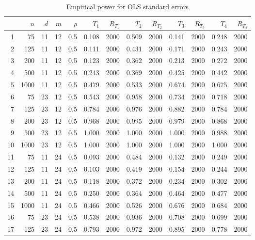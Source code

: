 \documentclass{article}
\begin{document}
\begin{table}[ht]
\begin{center}
\caption{Empirical power for OLS standard errors}
\label{tab:power}
\begin{tabular}{rrrrrrrrrrrrr}
  \hline
 & $n$ & $d$ & $m$ & $\rho$ & $T_1$ & $R_{T_1}$ & $T_2$ & $R_{T_2}$ & $T_3$ & $R_{T_3}$ & $T_4$ & $R_{T_4}$ \\ 
  \hline
1 & 75 & 11 & 12 & 0.5 & 0.108 & 2000 & 0.509 & 2000 & 0.141 & 2000 & 0.248 & 2000 \\ 
  2 & 125 & 11 & 12 & 0.5 & 0.111 & 2000 & 0.431 & 2000 & 0.171 & 2000 & 0.243 & 2000 \\ 
  3 & 200 & 11 & 12 & 0.5 & 0.123 & 2000 & 0.362 & 2000 & 0.213 & 2000 & 0.272 & 2000 \\ 
  4 & 500 & 11 & 12 & 0.5 & 0.243 & 2000 & 0.369 & 2000 & 0.425 & 2000 & 0.442 & 2000 \\ 
  5 & 1000 & 11 & 12 & 0.5 & 0.479 & 2000 & 0.533 & 2000 & 0.674 & 2000 & 0.675 & 2000 \\ 
   \hline
6 & 75 & 23 & 12 & 0.5 & 0.543 & 2000 & 0.958 & 2000 & 0.734 & 2000 & 0.718 & 2000 \\ 
  7 & 125 & 23 & 12 & 0.5 & 0.784 & 2000 & 0.976 & 2000 & 0.882 & 2000 & 0.784 & 2000 \\ 
  8 & 200 & 23 & 12 & 0.5 & 0.968 & 2000 & 0.995 & 2000 & 0.979 & 2000 & 0.868 & 2000 \\ 
  9 & 500 & 23 & 12 & 0.5 & 1.000 & 2000 & 1.000 & 2000 & 1.000 & 2000 & 0.988 & 2000 \\ 
  10 & 1000 & 23 & 12 & 0.5 & 1.000 & 2000 & 1.000 & 2000 & 1.000 & 2000 & 1.000 & 2000 \\ 
   \hline
11 & 75 & 11 & 24 & 0.5 & 0.093 & 2000 & 0.484 & 2000 & 0.132 & 2000 & 0.249 & 2000 \\ 
  12 & 125 & 11 & 24 & 0.5 & 0.103 & 2000 & 0.419 & 2000 & 0.154 & 2000 & 0.244 & 2000 \\ 
  13 & 200 & 11 & 24 & 0.5 & 0.118 & 2000 & 0.372 & 2000 & 0.234 & 2000 & 0.302 & 2000 \\ 
  14 & 500 & 11 & 24 & 0.5 & 0.250 & 2000 & 0.364 & 2000 & 0.464 & 2000 & 0.477 & 2000 \\ 
  15 & 1000 & 11 & 24 & 0.5 & 0.466 & 2000 & 0.526 & 2000 & 0.676 & 2000 & 0.684 & 2000 \\ 
   \hline
16 & 75 & 23 & 24 & 0.5 & 0.538 & 2000 & 0.936 & 2000 & 0.708 & 2000 & 0.699 & 2000 \\ 
  17 & 125 & 23 & 24 & 0.5 & 0.793 & 2000 & 0.972 & 2000 & 0.895 & 2000 & 0.778 & 2000 \\ 

\end{tabular}
\end{center}
\end{table}
\end{document}
